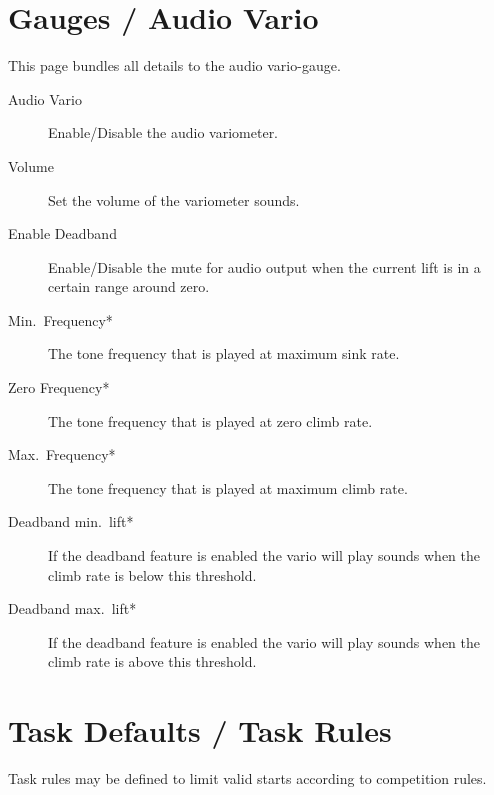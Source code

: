 \section{Gauges / Audio Vario}\label{sec:audiovario-gauge}

This page bundles all details to the audio vario-gauge. \label{conf:audiovariogauge}

\begin{description}
\item[Audio Vario]  Enable/Disable the audio variometer.
\item[Volume]  Set the volume of the variometer sounds.
\item[Enable Deadband]  Enable/Disable the mute for audio output when the current lift is in a certain range around zero.
\item[Min.\ Frequency*]  The tone frequency that is played at maximum sink rate.
\item[Zero Frequency*]  The tone frequency that is played at zero climb rate.
\item[Max.\ Frequency*]  The tone frequency that is played at maximum climb rate.
\item[Deadband min.\ lift*]  If the deadband feature is enabled the vario will play sounds when the climb rate is below this threshold.
\item[Deadband max.\ lift*]  If the deadband feature is enabled the vario will play sounds when the climb rate is above this threshold.
\end{description}


\section{Task Defaults / Task Rules}

Task rules may be defined to limit valid starts according to competition
rules. \label{conf:taskrules}

